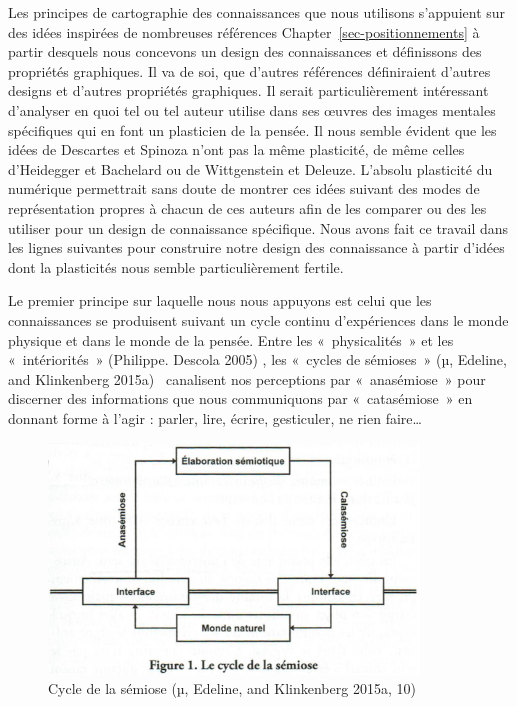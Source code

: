 \documentclass[
  letterpaper,
  DIV=11,
  numbers=noendperiod]{scrreprt}
\begin{document}
Les principes de cartographie des connaissances que nous utilisons
s'appuient sur des idées inspirées de nombreuses références
Chapter~\ref{sec-positionnements} à partir desquels nous concevons un
design des connaissances et définissons des propriétés graphiques. Il va
de soi, que d'autres références définiraient d'autres designs et
d'autres propriétés graphiques. Il serait particulièrement intéressant
d'analyser en quoi tel ou tel auteur utilise dans ses œuvres des images
mentales spécifiques qui en font un plasticien de la pensée. Il nous
semble évident que les idées de Descartes et Spinoza n'ont pas la même
plasticité, de même celles d'Heidegger et Bachelard ou de Wittgenstein
et Deleuze. L'absolu plasticité du numérique permettrait sans doute de
montrer ces idées suivant des modes de représentation propres à chacun
de ces auteurs afin de les comparer ou des les utiliser pour un design
de connaissance spécifique. Nous avons fait ce travail dans les lignes
suivantes pour construire notre design des connaissance à partir d'idées
dont la plasticités nous semble particulièrement fertile.

Le premier principe sur laquelle nous nous appuyons est celui que les
connaissances se produisent suivant un cycle continu d'expériences dans
le monde physique et dans le monde de la pensée. Entre les
«~physicalités~» et les «~intériorités~» (Philippe. Descola 2005) , les
«~cycles de sémioses~» (µ, Edeline, and Klinkenberg 2015a)~ canalisent
nos perceptions par «~anasémiose~» pour discerner des informations que
nous communiquons par «~catasémiose~» en donnant forme à l'agir :
parler, lire, écrire, gesticuler, ne rien faire\ldots{}

\begin{figure}

{\centering \includegraphics[width=9.855cm,height=6.145cm]{media/100000010000048C000002D6F38927B016A358A1.png}

}

\caption{\label{fig-cyclesemiose}Cycle de la sémiose (µ, Edeline, and
Klinkenberg 2015a, 10)}

\end{figure}
\end{document}
